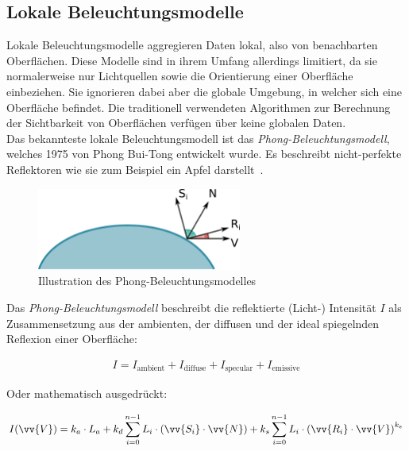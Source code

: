 \subsection{Lokale Beleuchtungsmodelle}
\label{subsec:local_illumination_models}

Lokale Beleuchtungsmodelle aggregieren Daten lokal, also von
benachbarten Oberflächen. Diese Modelle sind in ihrem Umfang allerdings
limitiert, da sie normalerweise nur Lichtquellen sowie die Orientierung
einer Oberfläche einbeziehen. Sie ignorieren dabei aber die globale
Umgebung, in welcher sich eine Oberfläche befindet.  Die traditionell
verwendeten Algorithmen zur Berechnung der Sichtbarkeit von Oberflächen
verfügen über keine globalen Daten.\\
Das bekannteste lokale Beleuchtungsmodell ist das
\textit{Phong-Beleuchtungsmodell}, welches 1975 von Phong Bui-Tong
entwickelt wurde\parencite{phong_illumination_1975}. Es beschreibt
nicht-perfekte Reflektoren wie sie zum Beispiel ein
Apfel darstellt~\parencite[Kapitel 16, Seite 729]{foley_computer_1996}.

\begin{figure}[H]
    \centering
    \includegraphics[width=0.6\textwidth]{img/phong_illumination_model.pdf}
    \caption{Illustration des Phong-Beleuchtungsmodelles\protect\footnotemark}\label{fig:phong_illustration}
\end{figure}

Das \textit{Phong-Beleuchtungsmodell} beschreibt die reflektierte
(Licht-) Intensität $I$ als Zusammensetzung aus der ambienten, der
diffusen und der ideal spiegelnden Reflexion einer Oberfläche:

\begin{gather}
    I = I_{\text{ambient}} + I_{\text{diffuse}} + I_{\text{specular}} + I_{\text{emissive}}
\end{gather}

Oder mathematisch ausgedrückt:

\begin{gather}\label{eq:phong_equation}
    I(\vv{V}) = k_{a} \cdot L_{a} +
                k_{d} \displaystyle\sum_{i=0}^{n - 1} L_{i} \cdot (\vv{S_{i}} \cdot \vv{N}) +
                k_{s} \displaystyle\sum_{i=0}^{n - 1} L_{i} \cdot {(\vv{R_{i}} \cdot \vv{V})}^{k_{e}}
\end{gather}

